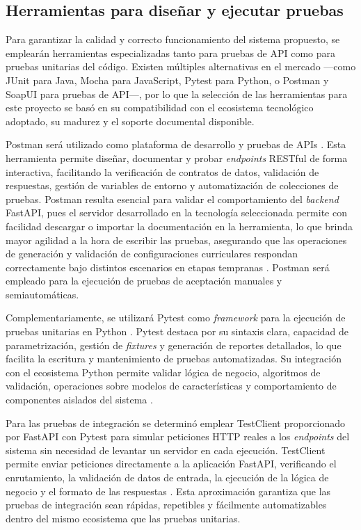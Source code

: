     
\subsection{Herramientas para diseñar y ejecutar pruebas}

Para garantizar la calidad y correcto funcionamiento del sistema propuesto, se 
emplearán herramientas especializadas tanto para pruebas de \ac{API} como para 
pruebas unitarias del código. Existen múltiples alternativas en el mercado —como 
JUnit para Java, Mocha para JavaScript, Pytest para Python, o Postman y SoapUI 
para pruebas de \ac{API}—, por lo que la selección de las herramientas para este 
proyecto se basó en su compatibilidad con el ecosistema tecnológico adoptado, 
su madurez y el soporte documental disponible.

Postman será utilizado como plataforma de desarrollo y pruebas de \ac{API}s 
\citep{postman2025docs}. Esta herramienta permite diseñar, documentar y probar \textit{endpoints} 
\ac{REST}ful de forma interactiva, facilitando la verificación de contratos de datos, 
validación de respuestas, gestión de variables de entorno y automatización de 
colecciones de pruebas. Postman resulta esencial para validar el comportamiento 
del \textit{backend} FastAPI, pues el servidor desarrollado en la tecnología seleccionada permite con facilidad
descargar o importar la documentación en la herramienta, lo que brinda mayor agilidad a la hora de escribir las pruebas, 
asegurando que las operaciones de generación y validación 
de configuraciones curriculares respondan correctamente bajo distintos escenarios en etapas tempranas
\citep{postman2025docs, fastapi2023docs}. Postman será empleado para la ejecución de pruebas de aceptación manuales 
y semiautomáticas.

Complementariamente, se utilizará Pytest como \textit{framework} para la 
ejecución de pruebas unitarias en Python \citep{pytest2025docs}. Pytest destaca por su 
sintaxis clara, capacidad de parametrización, gestión de \textit{fixtures} y generación 
de reportes detallados, lo que facilita la escritura y mantenimiento de pruebas 
automatizadas. Su integración con el ecosistema Python permite validar lógica de 
negocio, algoritmos de validación, operaciones sobre modelos de características 
y comportamiento de componentes aislados del sistema \citep{pytest2025docs}.

Para las pruebas de integración se determinó emplear TestClient proporcionado por FastAPI con 
Pytest para simular peticiones \ac{HTTP} reales a los \textit{endpoints} del sistema sin necesidad de levantar 
un servidor en cada ejecución. TestClient permite enviar peticiones directamente a la aplicación 
FastAPI, verificando el enrutamiento, la validación de datos de entrada, la ejecución de la lógica de negocio 
y el formato de las respuestas \citep{fastapi2025testing}. Esta aproximación garantiza que las pruebas de 
integración sean rápidas, repetibles y fácilmente automatizables dentro del mismo ecosistema que las pruebas 
unitarias.

